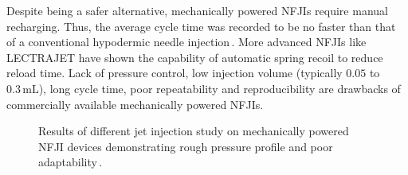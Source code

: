         Despite being a safer alternative, mechanically powered \acsp{NFJI} require manual recharging. Thus, the average cycle time was recorded to be no faster than that of a conventional hypodermic needle injection\,\cite{PharmaJet2011}. More advanced \acsp{NFJI} like LECTRAJET  have shown the capability of automatic spring recoil to reduce reload time. Lack of pressure control, low injection volume (typically $0.05$ to $0.3\,\mathrm{mL}$), long cycle time, poor repeatability and reproducibility are drawbacks of commercially available mechanically powered \acsp{NFJI}.
        
        \begin{figure}[!ht]
            \centering
            \qquad
            \caption[LoF entry]{
                Results of different jet injection study on mechanically powered \acs{NFJI} devices demonstrating rough pressure profile and poor adaptability\,\cite{schramm2002}.
            }   \label{fig:chapter/background/jet injection effectiveness}
        \end{figure}



